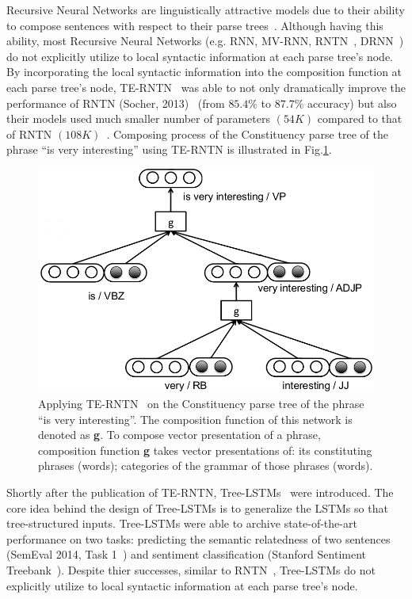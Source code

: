 Recursive Neural Networks are linguistically attractive models due to their ability to compose sentences with respect to their parse trees~\cite{treeLSTM}.
Although having this ability, most Recursive Neural Networks (e.g. RNN, MV-RNN, RNTN~\cite{socher2013recursive}, DRNN~\cite{IrsoyDRNN}) do not explicitly utilize to local syntactic information at each parse tree's node.
By incorporating the local syntactic information into the composition function at each parse tree's node, TE-RNTN~\cite{tag-embedding-rnn} was able to not only dramatically improve the performance of RNTN (Socher, 2013)~\cite{socher2013recursive} (from \(85.4\%\) to \(87.7\%\) accuracy) but also their models used much smaller number of parameters \((54K)\) compared to that of RNTN \((108K)\)~\cite{tag-embedding-rnn}.
Composing process of the Constituency parse tree of the phrase ``is very interesting'' using TE-RNTN is illustrated in Fig.\ref{fig:example-compose-tag}.

\begin{figure}[H]
    \centering
    \includegraphics[scale=0.4]{figure/example-compose-tag}
    \caption[Applying TE-RNTN on the phrase ``is very interesting'']{Applying TE-RNTN~\cite{tag-embedding-rnn} on the Constituency parse tree of the phrase ``is very interesting''.
    The composition function of this network is denoted as \textbf{g}.
    To compose vector presentation of a phrase, composition function \textbf{g} takes vector presentations of: its constituting phrases (words); categories of the grammar of those phrases (words).}
    \label{fig:example-compose-tag}
\end{figure}

Shortly after the publication of TE-RNTN, Tree-LSTMs~\cite{treeLSTM} were introduced.
The core idea behind the design of Tree-LSTMs is to generalize the LSTMs so that tree-structured inputs.
Tree-LSTMs were able to archive state-of-the-art performance on two tasks: predicting the semantic relatedness of two sentences (SemEval 2014, Task 1~\cite{SemeEvalTask1}) and sentiment classification (Stanford Sentiment Treebank~\cite{socher2013recursive}).
Despite thier successes, similar to RNTN~\cite{socher2013recursive}, Tree-LSTMs do not explicitly utilize to local syntactic information at each parse tree's node.

